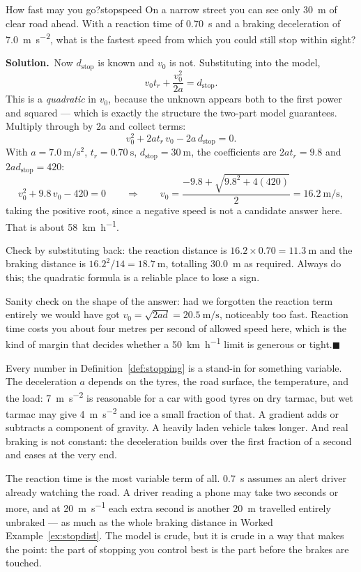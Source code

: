 \documentclass[11pt,twoside,openany]{book}
\newcounter{check}[chapter]
\newcommand{\solution}{\par\smallskip\noindent\textbf{Solution.}\ }
\newcommand{\qed}{\hfill$\blacksquare$}
\begin{document}
\begin{example}{How fast may you go?}{stopspeed}
On a narrow street you can see only \SI{30}{\metre} of clear road ahead. With a reaction time of \SI{0.70}{\second} and a braking deceleration of \SI{7.0}{\metre\per\second\squared}, what is the fastest speed from which you could still stop within sight?

\solution Now $d_{\text{stop}}$ is known and $v_0$ is not. Substituting into the model,
\[
v_0 t_r + \frac{v_0^{2}}{2a} = d_{\text{stop}} .
\]
This is a \emph{quadratic} in $v_0$, because the unknown appears both to the first power and squared --- which is exactly the structure the two-part model guarantees. Multiply through by $2a$ and collect terms:
\[
v_0^{2} + 2a t_r\,v_0 - 2a\,d_{\text{stop}} = 0 .
\]
With $a = \SI{7.0}{\metre\per\second\squared}$, $t_r = \SI{0.70}{\second}$, $d_{\text{stop}} = \SI{30}{\metre}$, the coefficients are $2at_r = \num{9.8}$ and $2ad_{\text{stop}} = \num{420}$:
\[
v_0^{2} + 9.8\,v_0 - 420 = 0
\qquad\Longrightarrow\qquad
v_0 = \frac{-9.8 + \sqrt{9.8^{2} + 4(420)}}{2} = \SI{16.2}{\metre\per\second},
\]
taking the positive root, since a negative speed is not a candidate answer here. That is about \SI{58}{\kilo\metre\per\hour}.

Check by substituting back: the reaction distance is $16.2 \times 0.70 = \SI{11.3}{\metre}$ and the braking distance is $16.2^2/14 = \SI{18.7}{\metre}$, totalling \SI{30.0}{\metre} as required. Always do this; the quadratic formula is a reliable place to lose a sign.

Sanity check on the shape of the answer: had we forgotten the reaction term entirely we would have got $v_0 = \sqrt{2 a d} = \SI{20.5}{\metre\per\second}$, noticeably too fast. Reaction time costs you about four metres per second of allowed speed here, which is the kind of margin that decides whether a \SI{50}{\kilo\metre\per\hour} limit is generous or tight.\qed
\end{example}

\begin{modelnote}
Every number in Definition~\ref{def:stopping} is a stand-in for something variable. The deceleration $a$ depends on the tyres, the road surface, the temperature, and the load: \SI{7}{\metre\per\second\squared} is reasonable for a car with good tyres on dry tarmac, but wet tarmac may give \SI{4}{\metre\per\second\squared} and ice a small fraction of that. A gradient adds or subtracts a component of gravity. A heavily laden vehicle takes longer. And real braking is not constant: the deceleration builds over the first fraction of a second and eases at the very end.

The reaction time is the most variable term of all. \SI{0.7}{\second} assumes an alert driver already watching the road. A driver reading a phone may take two seconds or more, and at \SI{20}{\metre\per\second} each extra second is another \SI{20}{\metre} travelled entirely unbraked --- as much as the whole braking distance in Worked Example~\ref{ex:stopdist}. The model is crude, but it is crude in a way that makes the point: the part of stopping you control best is the part before the brakes are touched.
\end{modelnote}
\end{document}
